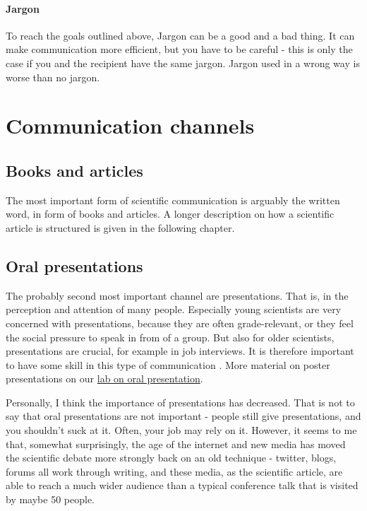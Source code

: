\documentclass{tufte-book}
\begin{document}
\paragraph{Jargon} To reach the goals outlined above, Jargon can be a good and a bad thing. It can make communication more efficient, but you have to be careful - this is only the case if you and the recipient have the same jargon. Jargon used in a wrong way is worse than no jargon.


\section{Communication channels}

\subsection{Books and articles}

The most important form of scientific communication is arguably the written word, in form of books and articles. A longer description on how a scientific article is structured is given in the following chapter. 

\subsection{Oral presentations}

The probably second most important channel are presentations. That is, in the perception and attention of many people. Especially young scientists are very concerned with presentations, because they are often grade-relevant, or they feel the social pressure to speak in from of a group. But also for older scientists, presentations are crucial, for example in job interviews. It is therefore important to have some skill in this type of communication \citep[see, e.g. the tips of][]{Kelleher-Tenguidelineseffective-2011}. More material on poster presentations on our \href{https://github.com/florianhartig/ResearchSkills/tree/master/Labs/OralPresentation}{lab on oral presentation}. 

Personally, I think the importance of presentations has decreased. That is not to say that oral presentations are not important - people still give presentations, and you shouldn't suck at it. Often, your job may rely on it. However, it seems to me that, somewhat surprisingly, the age of the internet and new media has moved the scientific debate more strongly back on an old technique - twitter, blogs, forums all work through writing, and these media, as the scientific article, are able to reach a much wider audience than a typical conference talk that is visited by maybe 50 people. 
\end{document}
